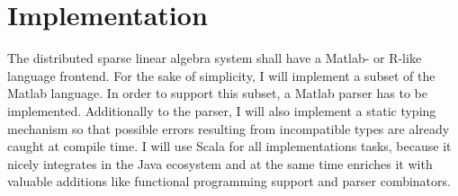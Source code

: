 \chapter{Implementation}
\label{cha:implementation}

The distributed sparse linear algebra system shall have a Matlab- or R-like language frontend.
For the sake of simplicity, I will implement a subset of the Matlab language.
In order to support this subset, a Matlab parser has to be implemented.
Additionally to the parser, I will also implement a static typing mechanism so that possible errors resulting from incompatible types are already caught at compile time.
I will use Scala for all implementations tasks, because it nicely integrates in the Java ecosystem and at the same time enriches it with valuable additions like functional programming support and parser combinators.